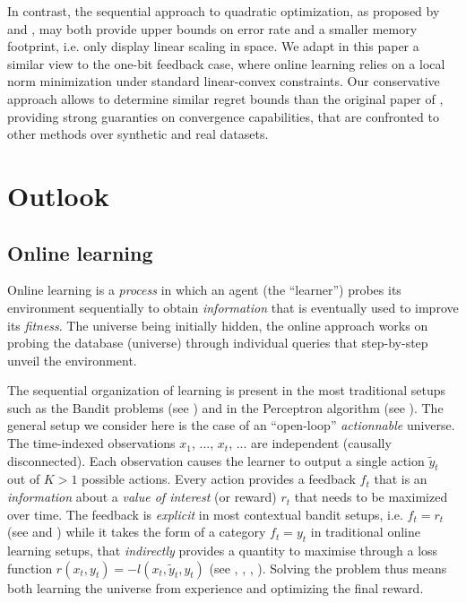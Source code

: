 \documentclass[preprint,12pt,authoryear]{elsarticle}
\begin{document}
In contrast, the sequential approach to quadratic optimization, as proposed by \cite{anlauf1989adatron} and \cite{crammer2006online}, may both provide upper bounds on error rate and a smaller memory footprint, i.e. only display linear scaling in space. 
We adapt in this paper a similar view to the one-bit feedback case, where online learning relies on a local norm minimization under standard linear-convex constraints. Our conservative approach allows to determine similar regret bounds than the original paper of \cite{crammer2006online}, providing strong guaranties on  convergence capabilities, that are confronted to other methods over synthetic and real datasets.  

\section{Outlook}

\subsection{Online learning} Online learning is a \textit{process} in which an agent (the ``learner'') probes its environment sequentially to obtain \textit{information} that is eventually used to improve its \textit{fitness}.
The universe being initially hidden, the online approach works on probing the database (universe) through individual queries that step-by-step unveil the environment. 

The sequential organization of learning is present in the most traditional setups such as the Bandit problems (see \cite{robbins1952bandit}) and in the Perceptron algorithm (see \cite{rosenblatt1958perceptron}). The general setup we consider here is the case of an ``open-loop'' \textit{actionnable} universe. The time-indexed observations $x_1$, ..., $x_t$, ... are independent (causally disconnected). Each observation causes the learner to output a single action $\tilde{y}_t$ out of $K > 1$ possible actions. Every action provides a feedback $f_t$ that is an \textit{information} about a \textit{value of interest} (or reward) $r_t$ that needs to be maximized over time. The feedback is \textit{explicit} in most contextual bandit setups, i.e. $f_t=r_t$ (see \cite{lai1985asymptotically} and \cite{auer2002finite}) while it takes the form of a category $f_t=y_t$ in traditional online learning setups, that \textit{indirectly} provides a quantity to maximise through a loss function $r(x_t, y_t) = -l(x_t,\tilde{y}_t, y_t)$ (see  \cite{duda1973pattern}, \cite{freund1999large}, \cite{kivinen2004online}, \cite{crammer2006online}). Solving the problem thus means both  learning the universe from experience and optimizing the final reward. 
\end{document}
